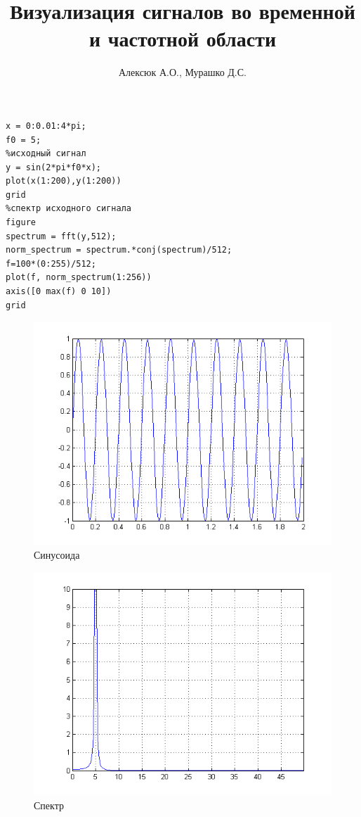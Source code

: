 \documentclass[a4paper, 12pt]{article}
\author{Алексюк А.О., Мурашко Д.С.}
\title{Визуализация сигналов во временной и частотной области}
\begin{document}
\maketitle
\tableofcontents
\pagebreak

\begin{lstlisting}
x = 0:0.01:4*pi;
f0 = 5;
%исходный сигнал
y = sin(2*pi*f0*x);
plot(x(1:200),y(1:200))
grid
%спектр исходного сигнала
figure
spectrum = fft(y,512);
norm_spectrum = spectrum.*conj(spectrum)/512;
f=100*(0:255)/512;
plot(f, norm_spectrum(1:256))
axis([0 max(f) 0 10])
grid
\end{lstlisting}

\begin{figure}[H]
   \includegraphics[width=\textwidth]{sin.png}
   \caption{Синусоида}
\end{figure}

\begin{figure}[H]
   \includegraphics[width=\textwidth]{spectre.png}
   \caption{Спектр}
\end{figure}
\end{document}
